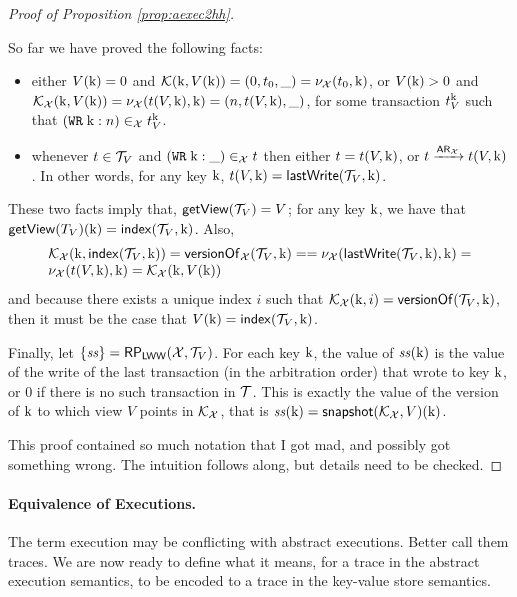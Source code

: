 \begin{proof}[Proof of Proposition \ref{prop:aexec2hh}]
\begin{itemize}
So far we have proved the following facts:
\begin{itemize}
\item either $V(\mathrm{k}) = 0$ and $\mathcal{K}(\mathrm{k}, V(\mathrm{k})) = (0, t_0, \_) = \nu_{\mathcal{X}}(t_0, \mathrm{k})$, 
or 
$V(\mathrm{k}) > 0$ and $\mathcal{K}_{\mathcal{X}}(\mathrm{k}, V(\mathrm{k})) = 
\nu_{\mathcal{X}}(t(V, \mathrm{k}), \mathrm{k}) = (n, t(V, \mathrm{k}), \_)$, 
for some transaction $t_{V}^{\mathrm{k}}$ such that $({{\tt WR}}\;\mathrm{k}:n) \in_{\mathcal{X}} t_{V}^{\mathrm{k}}$.
\item whenever $t \in \mathcal{T}_{V}$ and $({{\tt WR}}\;\mathrm{k}: \_) \in_{\mathcal{X}} t$ 
then either $t = t({V}, \mathrm{k})$, or $t \xrightarrow{{\sf{AR}}_{\mathcal{X}}} t({V}, \mathrm{k})$. 
In other words, for any key $\mathrm{k}$, $t(V, \mathrm{k}) = \mathsf{lastWrite}(\mathcal{T}_{V}, \mathrm{k})$. 
\end{itemize}
These two facts imply that, $\mathsf{getView}(\mathcal{T}_{V}) = V$; 
for any key $\mathrm{k}$, we have that 
$\mathsf{getView}(T_{V})(\mathrm{k}) = \mathsf{index}(\mathcal{T}_{V}, \mathrm{k})$.
Also, 
\[
\begin{array}{l}
\mathcal{K}_{\mathcal{X}}(\mathrm{k},\mathsf{index}(\mathcal{T}_{V}, \mathrm{k})) = \mathsf{versionOf}_{\mathcal{X}}(\mathcal{T}_V, \mathrm{k}) =  
= \nu_{\mathcal{X}}(\mathsf{lastWrite}(\mathcal{T}_V, \mathrm{k}), \mathrm{k}) = \\ 
\nu_{\mathcal{X}}(t(V, \mathrm{k}), \mathrm{k}) = 
\mathcal{K}_{\mathcal{X}}(\mathrm{k}, V(\mathrm{k}))
\end{array}
\]
and because there 
exists a unique index $i$ such that $\mathcal{K}_{\mathcal{X}}(\mathrm{k}, i) = \mathsf{versionOf}(\mathcal{T}_{V}, \mathrm{k})$, 
then it must be the case that $V(\mathrm{k}) = \mathsf{index}(\mathcal{T}_{V}, \mathrm{k})$.

Finally, let $\{ \mathit{ss} \} = \mathsf{RP}_{\mathsf{LWW}}(\mathcal{X}, \mathcal{T}_{V})$. 
For each key $\mathrm{k}$, the value of $\mathit{ss}(\mathrm{k})$ is the value of the write of the last transaction 
(in the arbitration order) that wrote to key $\mathrm{k}$, or $0$ if there is no such transaction in $\mathcal{T}$. 
This is exactly the value of the version of $\mathrm{k}$ to which view $V$ points in $\mathcal{K}_{\mathcal{X}}$, 
that is $\mathit{ss}(\mathrm{k}) = \mathsf{snapshot}(\mathcal{K}_{\mathcal{X}}, V)(\mathrm{k})$.

\end{itemize}
\ac{This proof contained so much notation that I got mad, and possibly got something 
wrong. The intuition follows along, but details need to be checked.}
\end{proof}

\paragraph{Equivalence of Executions.}
\ac{The term execution may be conflicting with abstract executions. Better call them traces.}
We are now ready to define what it means, for a trace in the abstract 
execution semantics, to be encoded to a trace in the key-value store semantics. 


